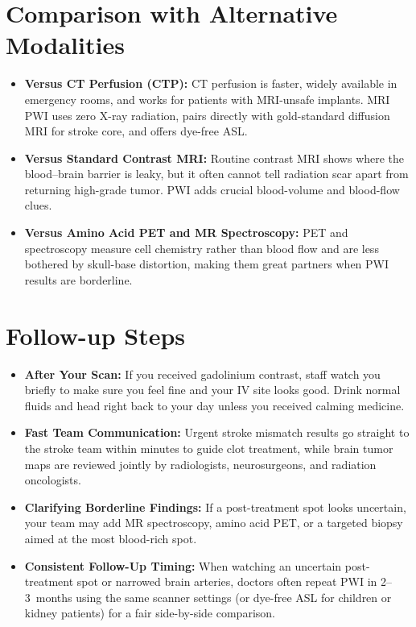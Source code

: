 \section{Comparison with Alternative Modalities}

\begin{itemize}
    \item \textbf{Versus CT Perfusion (CTP):} CT perfusion is faster, widely available in emergency rooms, and works for patients with MRI-unsafe implants. MRI PWI uses zero X-ray radiation, pairs directly with gold-standard diffusion MRI for stroke core, and offers dye-free ASL.
    \item \textbf{Versus Standard Contrast MRI:} Routine contrast MRI shows where the blood--brain barrier is leaky, but it often cannot tell radiation scar apart from returning high-grade tumor. PWI adds crucial blood-volume and blood-flow clues.
    \item \textbf{Versus Amino Acid PET and MR Spectroscopy:} PET and spectroscopy measure cell chemistry rather than blood flow and are less bothered by skull-base distortion, making them great partners when PWI results are borderline.
\end{itemize}

\section{Follow-up Steps}

\begin{itemize}
    \item \textbf{After Your Scan:} If you received gadolinium contrast, staff watch you briefly to make sure you feel fine and your IV site looks good. Drink normal fluids and head right back to your day unless you received calming medicine.
    \item \textbf{Fast Team Communication:} Urgent stroke mismatch results go straight to the stroke team within minutes to guide clot treatment, while brain tumor maps are reviewed jointly by radiologists, neurosurgeons, and radiation oncologists.
    \item \textbf{Clarifying Borderline Findings:} If a post-treatment spot looks uncertain, your team may add MR spectroscopy, amino acid PET, or a targeted biopsy aimed at the most blood-rich spot.
    \item \textbf{Consistent Follow-Up Timing:} When watching an uncertain post-treatment spot or narrowed brain arteries, doctors often repeat PWI in 2--3~months using the same scanner settings (or dye-free ASL for children or kidney patients) for a fair side-by-side comparison.
\end{itemize}

